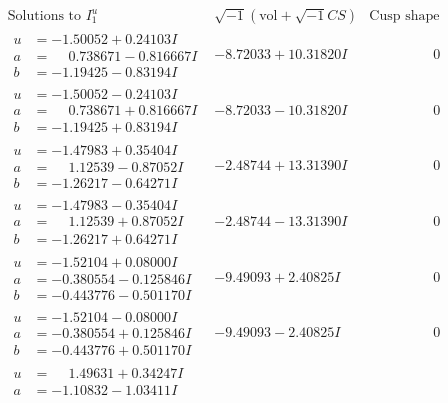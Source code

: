 \documentclass[1p]{elsarticle_modified}
\theoremstyle{definition}
\newcommand{\I}{\sqrt{-1}}
\begin{document}
$$\begin{array}{c|c|c}
\text{Solutions to }I^u_{1}& \I (\text{vol} + \sqrt{-1}CS) & \text{Cusp shape}\\
 \hline 
\begin{aligned}
u &= -1.50052 + 0.24103 I \\
a &= \phantom{-}0.738671 - 0.816667 I \\
b &= -1.19425 - 0.83194 I\end{aligned}
 & -8.72033 + 10.31820 I & \phantom{-0.000000 } 0 \\ \hline\begin{aligned}
u &= -1.50052 - 0.24103 I \\
a &= \phantom{-}0.738671 + 0.816667 I \\
b &= -1.19425 + 0.83194 I\end{aligned}
 & -8.72033 - 10.31820 I & \phantom{-0.000000 } 0 \\ \hline\begin{aligned}
u &= -1.47983 + 0.35404 I \\
a &= \phantom{-}1.12539 - 0.87052 I \\
b &= -1.26217 - 0.64271 I\end{aligned}
 & -2.48744 + 13.31390 I & \phantom{-0.000000 } 0 \\ \hline\begin{aligned}
u &= -1.47983 - 0.35404 I \\
a &= \phantom{-}1.12539 + 0.87052 I \\
b &= -1.26217 + 0.64271 I\end{aligned}
 & -2.48744 - 13.31390 I & \phantom{-0.000000 } 0 \\ \hline\begin{aligned}
u &= -1.52104 + 0.08000 I \\
a &= -0.380554 - 0.125846 I \\
b &= -0.443776 - 0.501170 I\end{aligned}
 & -9.49093 + 2.40825 I & \phantom{-0.000000 } 0 \\ \hline\begin{aligned}
u &= -1.52104 - 0.08000 I \\
a &= -0.380554 + 0.125846 I \\
b &= -0.443776 + 0.501170 I\end{aligned}
 & -9.49093 - 2.40825 I & \phantom{-0.000000 } 0 \\ \hline\begin{aligned}
u &= \phantom{-}1.49631 + 0.34247 I \\
a &= -1.10832 - 1.03411 I \\

\end{aligned}
\end{array}$$
\end{document}
